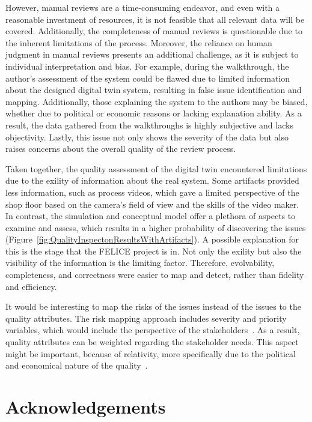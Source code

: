 \documentclass{llncs}
\begin{document}
    However, manual reviews are a time-consuming endeavor, and even with a reasonable investment of resources, it is not feasible that all relevant data will be covered. 
    Additionally, the completeness of manual reviews is questionable due to the inherent limitations of the process. 
    Moreover, the reliance on human judgment in manual reviews presents an additional challenge, as it is subject to individual interpretation and bias.  
    For example, during the walkthrough, the author's assessment of the system could be flawed due to limited information about the designed digital twin system, resulting in false 
    issue identification and mapping. Additionally, those explaining the system to the authors may be biased, 
    whether due to political or economic reasons or lacking explanation ability. As a result, the data gathered from the walkthroughs is highly subjective and lacks objectivity. Lastly, this issue not only shows the severity of the data but also raises concerns about 
    the overall quality of the review process.

    Taken together, the quality assessment of the digital twin encountered limitations due to the exility of information about the real system. 
    Some artifacts provided less information, such as process videos, which gave a limited perspective of the shop floor based on the camera's 
    field of view and the skills of the video maker. In contrast, the simulation and conceptual model offer a plethora of aspects to examine and assess, 
    which results in a higher probability of discovering the issues (Figure~\ref{fig:QualityInspectonResultsWithArtifacts}). 
    A possible explanation for this is the stage that the FELICE project is in. Not only the exility but also the visibility of the information is the limiting factor. 
    Therefore, evolvability, completeness, and correctness were easier to map and detect, rather than fidelity and efficiency. 

    It would be interesting to map the risks of the issues instead of the issues to the quality attributes. 
    The risk mapping approach includes severity and priority variables, which would include the perspective of the stakeholders~\cite{CemKanerSoftwareTesting,ISO/IEC/IEEE29119}.
    As a result, quality attributes can be weighted regarding the stakeholder needs. This aspect might be important, because of relativity, 
    more specifically due to the political and economical nature of the quality~\cite{SystemQuality}. 
    \section*{Acknowledgements}
   
    
    

    
\end{document}
